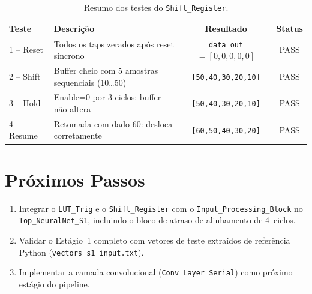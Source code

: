 \documentclass[a4paper,12pt]{article}
\begin{document}
\begin{table}[H]
\centering
\caption{Resumo dos testes do \texttt{Shift\_Register}.}
\label{tab:sr_results}
\small
\begin{tabular}{llcc}
\hline
\textbf{Teste} & \textbf{Descri\c{c}\~ao} & \textbf{Resultado} & \textbf{Status} \\
\hline
1 -- Reset       & Todos os taps zerados ap\'os reset s\'incrono        & \texttt{data\_out} $= [0,0,0,0,0]$ & PASS \\
2 -- Shift       & Buffer cheio com 5 amostras sequenciais (10\ldots50) & \texttt{[50,40,30,20,10]}           & PASS \\
3 -- Hold        & Enable=0 por 3 ciclos: buffer n\~ao altera           & \texttt{[50,40,30,20,10]}           & PASS \\
4 -- Resume      & Retomada com dado 60: desloca corretamente           & \texttt{[60,50,40,30,20]}           & PASS \\
\hline
\end{tabular}
\end{table}


\section{Pr\'oximos Passos}

\begin{enumerate}
    \item Integrar o \texttt{LUT\_Trig} e o \texttt{Shift\_Register} com o
          \texttt{Input\_Processing\_Block} no \texttt{Top\_NeuralNet\_S1}, incluindo o
          bloco de atraso de alinhamento de 4~ciclos.
    \item Validar o Est\'agio~1 completo com vetores de teste extra\'idos de refer\^encia
          Python (\texttt{vectors\_s1\_input.txt}).
    \item Implementar a camada convolucional (\texttt{Conv\_Layer\_Serial}) como pr\'oximo
          est\'agio do pipeline.
\end{enumerate}
\end{document}
